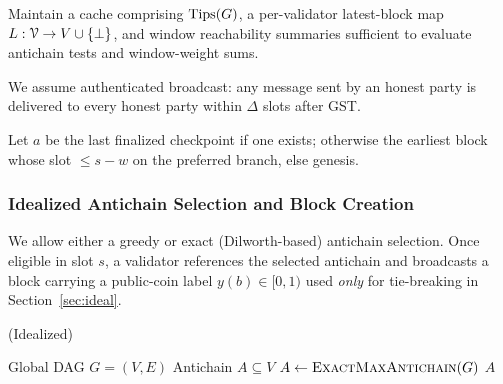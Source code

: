 
\begin{definition}[\ForkChoiceUpdate]
Maintain a cache comprising $\mathrm{Tips}(G)$, a per-validator latest-block map $L:\mathcal{V}\to V\cup\{\bot\}$, and window reachability summaries sufficient to evaluate antichain tests and window-weight sums.
\end{definition}
\begin{definition}[\Broadcast]
We assume authenticated broadcast: any message sent by an honest party is delivered to every honest party within $\Delta$ slots after GST.
\end{definition}
\begin{definition}
Let $a$ be the last finalized checkpoint if one exists; otherwise the earliest block whose slot $\le s-w$ on the preferred branch, else genesis.
\end{definition}



\subsubsection{Idealized Antichain Selection and Block Creation}
We allow either a greedy or exact (Dilworth-based) antichain selection. Once eligible in slot $s$, a validator references
the selected antichain and broadcasts a block carrying a public-coin label $y(b)\in[0,1)$ used \emph{only} for tie-breaking in Section~\ref{sec:ideal}. 



\begin{algorithm}[H]
\caption{\AntichainSelection (Idealized)}
\label{alg:ideal-antichain}
\begin{algorithmic}[1]
\Require Global DAG $G=(V,E)$
\Ensure Antichain $A\subseteq V$
\State $A \gets \textsc{ExactMaxAntichain}(G)$ %
\State \Return $A$
\end{algorithmic}
\end{algorithm}

